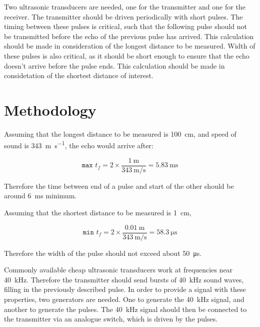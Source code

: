 \documentclass[12pt, a4paper]{article}
\begin{document}
        \bigskip 
        Two ultrasonic transducers are needed, one for the transmitter and one for the receiver. The transmitter should be driven periodically with short pulses. The timing between these pulses is critical, such that the following pulse should not be transmitted before the echo of the previous pulse has arrived. This calculation should be made in consideration of the longest distance to be measured. Width of these pulses is also critical, as it should be short enough to ensure that the echo doesn't arrive before the pulse ends. This calculation should be made in considetation of the shortest distance of interest. 
    

    \pagebreak    
    \section{Methodology}
    
   
    Assuming that the longest distance to be measured is \SI{100}{\centi\metre}, and speed of sound is \SI{343}{\metre\per\second}, the echo would arrive after:

    \begin{equation}
        \texttt{max }t_f = 2 \times \frac{\SI{1}{\metre}}{\SI{343}{\metre\per\second}} = \SI{5.83}{\milli\second}
    \end{equation}

    \noindent Therefore the time between end of a pulse and start of the other should be around \SI{6}{\milli\second} minimum. 

    \noindent Assuming that the shortest distance to be measured is \SI{1}{\centi\metre}, 

    \begin{equation}
        \texttt{min }t_f = 2 \times \frac{\SI{0.01}{\metre}}{\SI{343}{\metre\per\second}} = \SI{58.3}{\micro\second}
    \end{equation}

    \noindent Therefore the width of the pulse should not exceed about \SI{50}{\micro\second}.


    \bigskip
    Commonly available cheap ultrasonic transducers work at frequencies near \SI{40}{\kilo\hertz}. Therefore the transmitter should send bursts of \SI{40}{\kilo\hertz} sound waves, filling in the previously described pulse. In order to provide a signal with these properties, two generators are needed. One to generate the \SI{40}{\kilo\hertz} signal, and another to generate the pulses. The \SI{40}{\kilo\hertz} signal should then be connected to the transmitter via an analogue switch, which is driven by the pulses.
\end{document}
